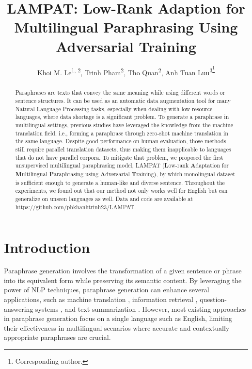 \documentclass[letterpaper]{article} %
\title{LAMPAT: Low-Rank Adaption for Multilingual Paraphrasing Using Adversarial Training}
\author{
    Khoi M. Le\textsuperscript{\rm 1, \rm 2}\equalcontrib, 
    Trinh Pham\textsuperscript{\rm 2}\equalcontrib,
    Tho Quan\textsuperscript{\rm 2},
    Anh Tuan Luu\textsuperscript{\rm 3\thanks{Corresponding author.}}
}
\begin{document}
\maketitle

\begin{abstract}
Paraphrases are texts that convey the same meaning while using different words or sentence structures. It can be used as an automatic data augmentation tool for many Natural Language Processing tasks, especially when dealing with low-resource languages, where data shortage is a significant problem. To generate a paraphrase in multilingual settings, previous studies have leveraged the knowledge from the machine translation field, i.e., forming a paraphrase through zero-shot machine translation in the same language. Despite good performance on human evaluation, those methods still require parallel translation datasets, thus making them inapplicable to languages that do not have parallel corpora. To mitigate that problem, we proposed the first unsupervised multilingual paraphrasing model, LAMPAT (\textbf{L}ow-rank \textbf{A}daptation for \textbf{M}ultilingual \textbf{P}araphrasing using \textbf{A}dversarial \textbf{T}raining), by which monolingual dataset is sufficient enough to generate a human-like and diverse sentence. Throughout the experiments, we found out that our method not only works well for English but can generalize on unseen languages as well. Data and code are available at \url{https://github.com/phkhanhtrinh23/LAMPAT}. %
\end{abstract}

\section{Introduction}

Paraphrase generation involves the transformation of a given sentence or phrase into its equivalent form while preserving its semantic content. By leveraging the power of NLP techniques, paraphrase generation can enhance several applications, such as machine translation \citep{freitag-etal-2020-human}, information retrieval \citep{NEURIPS2020_d6f1dd03}, question-answering systems \citep{gan-ng-2019-improving}, and text summarization \citep{Cao2017}. However, most existing approaches in paraphrase generation focus on a single language such as English, limiting their effectiveness in multilingual scenarios where accurate and contextually appropriate paraphrases are crucial.
\end{document}
